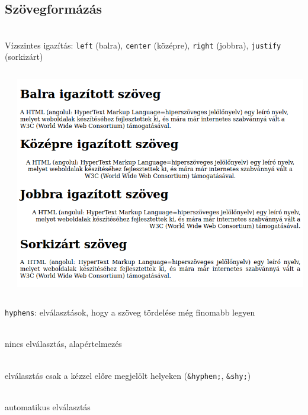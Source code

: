 \subsection{Szövegformázás}

\begin{frame}
  \begin{description}[m]
    \item[\texttt{text-align}] \hfill \\ Vízszintes igazítás: \texttt{left} (balra), \texttt{center} (középre), \texttt{right} (jobbra), \texttt{justify} (sorkizárt)
  \end{description}
  \begin{columns}[c]
      \begin{exampleblock}{}
        \tiny
        
        
      \end{exampleblock}
      \includegraphics[width=\textwidth]{vizszintes.png}
  \end{columns}
\end{frame}

\begin{frame}
  \texttt{hyphens}: elválasztások, hogy a szöveg tördelése még finomabb legyen
  \begin{description}[m]
    \item[\texttt{none}] \hfill \\ nincs elválasztás, alapértelmezés
    \item[\texttt{manual}] \hfill \\ elválasztás csak a kézzel előre megjelölt helyeken (\texttt{\&hyphen;}, \texttt{\&shy;})
    \item[\texttt{auto}] \hfill \\ automatikus elválasztás
  \end{description}
\end{frame}

